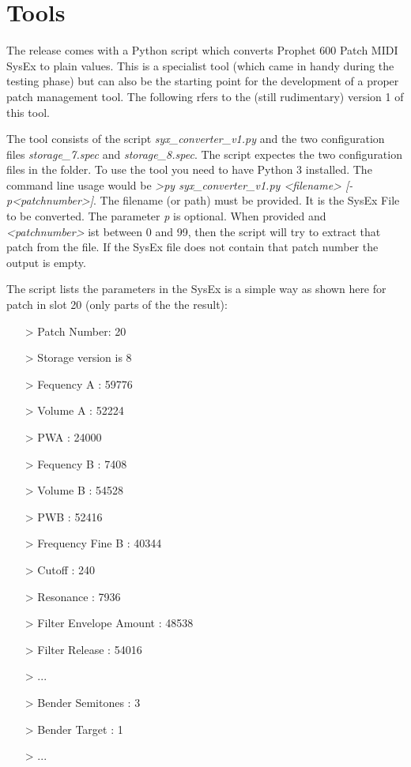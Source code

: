 \documentclass[landscape, 11pt, oneside]{report}
\begin{document}


\section{Tools}

The release comes with a Python script which converts Prophet 600 Patch MIDI SysEx to plain values. This is a specialist tool (which came in handy during the testing phase) but can also be the starting point for the development of a proper patch management tool. The following rfers to the (still rudimentary) version 1 of this tool.

The tool consists of the script \textit{syx\_converter\_v1.py} and the two configuration files \textit{storage\_7.spec} and \textit{storage\_8.spec}. The script expectes the two configuration files in the folder. To use the tool you need to have Python 3 installed. The command line usage would be \textit{>py syx\_converter\_v1.py <filename> [-p<patchnumber>]}. The filename (or path) must be provided. It is the SysEx File to be converted. The parameter \textit{p} is optional. When provided and \textit{<patchnumber>} ist between 0 and 99, then the script will try to extract that patch from the file. If the SysEx file does not contain that patch number the output is empty.

The script lists the parameters in the SysEx is a simple way as shown here for patch in slot 20 (only parts of the the result):

\begin{itemize}
  \item[>] Patch Number:  20 
  \item[>] Storage version is 8
  \item[>] Fequency A :  59776
  \item[>] Volume A :  52224
  \item[>] PWA :  24000 
  \item[>] Fequency B :  7408 
  \item[>] Volume B :  54528
  \item[>] PWB :  52416
  \item[>] Frequency Fine B :  40344
  \item[>] Cutoff :  240
  \item[>] Resonance :  7936
  \item[>] Filter Envelope Amount :  48538
  \item[>] Filter Release :  54016
  \item[>] ...  
  \item[>] Bender Semitones :  3
  \item[>] Bender Target :  1
  \item[>] ...  
\end{itemize}
\end{document}
